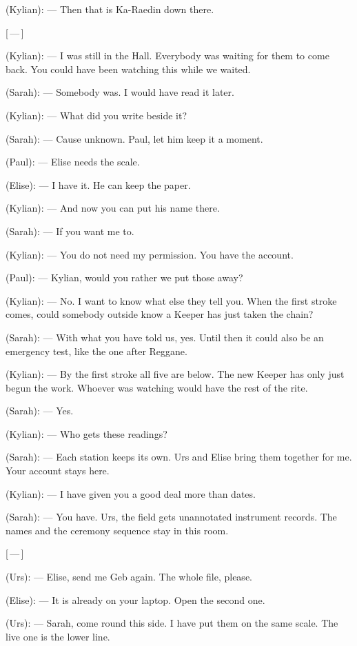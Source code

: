\begin{room}
(Kylian): --- Then that is Ka-Raedin down there.

\centerline{[\,---\,]}

(Kylian): --- I was still in the Hall. Everybody was waiting for them to come back. You could have been watching this while we waited.

(Sarah): --- Somebody was. I would have read it later.

(Kylian): --- What did you write beside it?

(Sarah): --- Cause unknown. Paul, let him keep it a moment.

(Paul): --- Elise needs the scale.

(Elise): --- I have it. He can keep the paper.

(Kylian): --- And now you can put his name there.

(Sarah): --- If you want me to.

(Kylian): --- You do not need my permission. You have the account.

(Paul): --- Kylian, would you rather we put those away?

(Kylian): --- No. I want to know what else they tell you. When the first stroke comes, could somebody outside know a Keeper has just taken the chain?

(Sarah): --- With what you have told us, yes. Until then it could also be an emergency test, like the one after Reggane.

(Kylian): --- By the first stroke all five are below. The new Keeper has only just begun the work. Whoever was watching would have the rest of the rite.

(Sarah): --- Yes.

(Kylian): --- Who gets these readings?

(Sarah): --- Each station keeps its own. Urs and Elise bring them together for me. Your account stays here.

(Kylian): --- I have given you a good deal more than dates.

(Sarah): --- You have. Urs, the field gets unannotated instrument records. The names and the ceremony sequence stay in this room.

\centerline{[\,---\,]}

(Urs): --- Elise, send me Geb again. The whole file, please.

(Elise): --- It is already on your laptop. Open the second one.

(Urs): --- Sarah, come round this side. I have put them on the same scale. The live one is the lower line.


\end{room}
